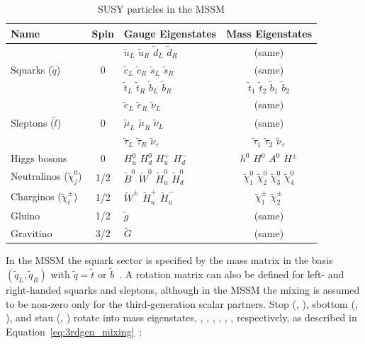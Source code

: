 				\begin{table}[!htb]\centering\caption{\ac{SUSY} particles in the \ac{MSSM}}
				\renewcommand{\arraystretch}{1.4}
					\begin{tabular}{lclc}
						\toprule
						\textbf{Name} & \textbf{Spin} & \textbf{Gauge Eigenstates} & \textbf{Mass Eigenstates} \\
						\toprule
						
						\multirow{3}{*}{Squarks ($\tilde{q}$)} & \multirow{3}{*}{0} 
						& $\tilde{u}_L$ $\tilde{u}_R$ $\tilde{d}_L$ $\tilde{d}_R$ & (same) \\
						& & $\tilde{c}_L$ $\tilde{c}_R$ $\tilde{s}_L$ $\tilde{s}_R$ & (same) \\
						& & $\tilde{t}_L$ $\tilde{t}_R$ $\tilde{b}_L$ $\tilde{b}_R$ & $\tilde{t}_1$ $\tilde{t}_2$ $\tilde{b}_1$ $\tilde{b}_2$ \\ 
						\midrule

						\multirow{3}{*}{Sleptons ($\tilde{l}$)} & \multirow{3}{*}{0} 
						& $\tilde{e}_L$ $\tilde{e}_R$ $\tilde{\nu}_L$ & (same) \\
						& & $\tilde{\mu}_L$ $\tilde{\mu}_R$ $\tilde{\nu}_L$ & (same) \\ 
						& & $\tilde{\tau}_L$ $\tilde{\tau}_R$ $\tilde{\nu}_{\tau}$ & $\tilde{\tau}_1$ $\tilde{\tau}_2$ $\tilde{\nu}_{\tau}$ \\ 
						\midrule
						
						Higgs bosons & 0 & $H_u^0$ $H_d^0$ $H_u^+$ $H_d^-$ & $h^0$ $H^0$ $A^0$ $H^{\pm}$ \\ 
						\midrule 

						Neutralinos ($\tilde{\chi}_j^0$)   & 1/2 & $\tilde{B}^0$ $\tilde{W}^0$ $\tilde{H}_u^0$ $\tilde{H}_d^0$ & $\tilde{\chi}_1^0$ $\tilde{\chi}_2^0$ $\tilde{\chi}_3^0$ $\tilde{\chi}_4^0$\\
						Charginos ($\tilde{\chi}_i^{\pm}$) & 1/2 & $\tilde{W}^{\pm}$ $\tilde{H}_u^+$ $\tilde{H}_u^-$ & $\tilde{\chi}_1^{\pm}$ $\tilde{\chi}_2^{\pm}$ \\
						\midrule

						Gluino & 1/2 & $\tilde{g}$ & (same) \\
						Gravitino & 3/2 & $\tilde{G}$ & (same) \\ 					
						\bottomrule
					\end{tabular}						
				\label{tab:MSSM_particles} 
				\end{table}


				In the \ac{MSSM} the squark sector is specified by the mass matrix in the basis $(\tilde{q}_L, \tilde{q}_R)$ with $\tilde{q} = \tilde{t}$ or $\tilde{b}$~\cite{Haber:1984rc}. A rotation matrix can also be defined for left- and right-handed squarks and sleptons, although in the \ac{MSSM} the mixing is assumed to be non-zero only for the third-generation scalar partners. Stop (\stopL, \stopR), sbottom (\sbottomL, \sbottomR), and stau (\stauL, \stauR) rotate into mass eigenstates, \stopone, \stoptwo, \sbottomone, \sbottomtwo, \stauone, \stautwo, respectively, as described in Equation~\ref{eq:3rdgen_mixing}~\cite{Hidaka:2000cm}: %

